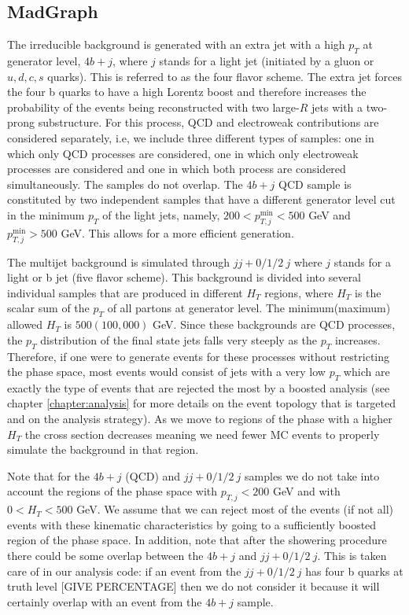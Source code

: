 \subsection{MadGraph}

The irreducible background is generated with an extra jet with a high $p_T$ at generator level, $4b+j$, where $j$ stands for a light jet (initiated by a gluon or $u,d,c,s$ quarks). This is referred to as the four flavor scheme. The extra jet forces the four b quarks to have a high Lorentz boost and therefore increases the probability of the events being reconstructed with two large-$R$ jets with a two-prong substructure. For this process, QCD and electroweak contributions are considered separately, i.e, we include three different types of samples: one in which only QCD processes are considered, one in which only electroweak processes are considered and one in which both process are considered simultaneously. The samples do not overlap. The $4b+j$ QCD sample is constituted by two independent samples that have a different generator level cut in the minimum $p_T$ of the light jets, namely, $200<p_{T,j}^{\min}<500$ GeV and $p_{T,j}^{\min}>500$ GeV. This allows for a more efficient generation. 

The multijet background is simulated through $jj+0/1/2 ~j$ where $j$ stands for a light or b jet (five flavor scheme).
This background is divided into several individual samples that are produced in different $H_T$ regions, where $H_T$ is the scalar sum of the $p_T$ of all partons at generator level. The minimum(maximum) allowed $H_T$ is $500(100,000)$ GeV. Since these backgrounds are QCD processes, the $p_T$ distribution of the final state jets falls very steeply as the $p_T$ increases. Therefore, if one were to generate events for these processes without restricting the phase space, most events would consist of jets with a very low $p_T$ which are exactly the type of events that are rejected the most by a boosted analysis (see chapter \ref{chapter:analysis} for more details on the event topology that is targeted and on the analysis strategy). As we move to regions of the phase with a higher $H_T$ the cross section decreases meaning we need fewer MC events to properly simulate the background in that region.

Note that for the $4b+j$ (QCD) and $jj+0/1/2 ~j$ samples we do not take into account the regions of the phase space with $p_{T,j}<200$ GeV and with $0<H_T<500$ GeV. We assume that we can reject most of the events (if not all) events with these kinematic characteristics by going to a sufficiently boosted region of the phase space. In addition, note that after the showering procedure there could be some overlap between the $4b+j$ and $jj+0/1/2~ j$. This is taken care of in our analysis code: if an event from the $jj+0/1/2 ~j$ has four b quarks at truth level [GIVE PERCENTAGE] then we do not consider it because it will certainly overlap with an event from the $4b+j$ sample.


